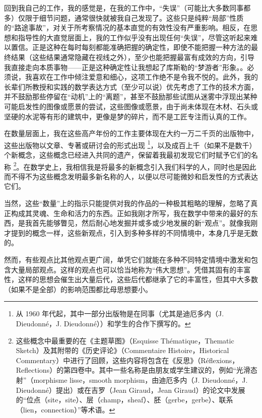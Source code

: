 {回到我自己的工作，我的感觉是，在我的工作中，“失误”（可能比大多数同事都多）仅限于细节问题，通常很快就被我自己发现了。这些只是纯粹“局部”性质的“路途事故”，对关于所考察情况的基本直觉的有效性没有严重影响。相反，在思想和指导性的大直觉层面上，我的工作似乎没有出现任何“失误”，尽管这听起来难以置信。正是这种在每时每刻都能准确把握的确定性，即使不能把握一种方法的最终结果（这些结果通常隐藏在视线之外），至少也能把握最富有成效的方向，引导我直接走向本质事物——正是这种确定性让我想起了库斯勒的“梦游者”形象。}。必须说，我喜欢在工作中倾注爱意和细心，这项工作绝不是令我不悦的。此外，我的长辈们所教授和实践的数学表达方式（至少可以说）优先考虑了工作的技术方面，并不鼓励那些停留在“动机”上的“离题”，甚至不鼓励那些试图从迷雾中浮现出某种可能启发性的图像或愿景的尝试，这些图像或愿景，由于尚未体现在木材、石头或坚硬的水泥等有形的建筑中，更像是梦的碎片，而不是工匠专注而认真的工作。

在数量层面上，我在这些高产年份的工作主要体现在大约一万二千页的出版物中，这些出版物以文章、专著或研讨会的形式出现 \footnote{从 1960 年代起，其中一部分出版物是在同事（尤其是迪厄多内（J. Dieudonné，J. Dieudonné））和学生的合作下撰写的。}，以及成百上千（如果不是数千）个新概念，这些概念已经进入共同的遗产，保留着我最初发现它们时赋予它们的名称 \footnote{这些概念中最重要的在《主题草图》（Esquisse Thématique，Thematic Sketch）及其附带的《历史评论》（Commentaire Histoire，Historical Commentary）中进行了回顾，这些内容将包含在《反思》（Réflexions，Reflections）的第四卷中。其中一些名称是由朋友或学生建议的，例如“光滑态射”（morphisme lisse，smooth morphism，由迪厄多内（J. Dieudonné，J. Dieudonné）提出）或在吉罗（Jean Giraud，Jean Giraud）的论文中发展的“位点（site，site）、层（champ，sheaf）、胚（gerbe，gerbe）、联系（lien，connection）”等术语。}。在数学史上，我相信我是将最多的新概念引入我们科学的人，同时也是因此而不得不为这些概念发明最多新名称的人，以便以尽可能微妙和启发性的方式表达它们。

当然，这些“数量”上的指示只能提供对我的作品的一种极其粗略的理解，忽略了真正构成其灵魂、生命和活力的东西。正如我刚才所写，我在数学中带来的最好的东西，是我首先能够瞥见，然后耐心地发掘并或多或少地发展的新“观点”。就像我刚才提到的概念一样，这些新观点，引入到多种多样的不同情境中，本身几乎是无数的。

然而，有些观点比其他观点更广阔，单凭它们就能在多种不同特定情境中激发和包含大量局部观点。这样的观点也可以恰当地称为“伟大思想”。凭借其固有的丰富性，这样的思想会催生出大量后代，这些后代都继承了它的丰富性，但其中大多数（如果不是全部）的影响范围都比母思想要小。

